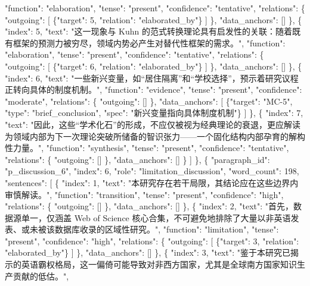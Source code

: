 \documentclass[12pt,a4paper]{article}
\begin{document}
          "function": "elaboration",
          "tense": "present",
          "confidence": "tentative",
          "relations": \{
            "outgoing": [
              \{"target": 5, "relation": "elaborated\_by"\}
            ]
          \},
          "data\_anchors": []
        \},
        \{
          "index": 5,
          "text": "这一现象与 Kuhn 的范式转换理论具有启发性的关联：随着既有框架的预测力被穷尽，领域内势必产生对替代性框架的需求。",
          "function": "elaboration",
          "tense": "present",
          "confidence": "tentative",
          "relations": \{
            "outgoing": [
              \{"target": 6, "relation": "elaborated\_by"\}
            ]
          \},
          "data\_anchors": []
        \},
        \{
          "index": 6,
          "text": "一些新兴变量，如“居住隔离”和“学校选择”，预示着研究议程正转向具体的制度机制。",
          "function": "evidence",
          "tense": "present",
          "confidence": "moderate",
          "relations": \{
            "outgoing": []
          \},
          "data\_anchors": [
            \{"target": "MC-5", "type": "brief\_conclusion", "spec": "新兴变量指向具体制度机制"\}
          ]
        \},
        \{
          "index": 7,
          "text": "因此，这些“学术化石”的形成，不应仅被视为经典理论的衰退，更应解读为领域内部为下一次理论突破所储备的智识张力——一个固化结构内部孕育的解构性力量。",
          "function": "synthesis",
          "tense": "present",
          "confidence": "tentative",
          "relations": \{
            "outgoing": []
          \},
          "data\_anchors": []
        \}
      ]
    \},
    \{
      "paragraph\_id": "p\_discussion\_6",
      "index": 6,
      "role": "limitation\_discussion",
      "word\_count": 198,
      "sentences": [
        \{
          "index": 1,
          "text": "本研究存在若干局限，其结论应在这些边界内审慎解读。",
          "function": "transition",
          "tense": "present",
          "confidence": "high",
          "relations": \{
            "outgoing": []
          \},
          "data\_anchors": []
        \},
        \{
          "index": 2,
          "text": "首先，数据源单一，仅涵盖 Web of Science 核心合集，不可避免地排除了大量以非英语发表、或未被该数据库收录的区域性研究。",
          "function": "limitation",
          "tense": "present",
          "confidence": "high",
          "relations": \{
            "outgoing": [
              \{"target": 3, "relation": "elaborated\_by"\}
            ]
          \},
          "data\_anchors": []
        \},
        \{
          "index": 3,
          "text": "鉴于本研究已揭示的英语霸权格局，这一偏倚可能导致对非西方国家，尤其是全球南方国家知识生产贡献的低估。",
\end{document}
